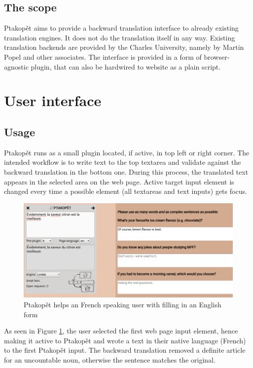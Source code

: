 \documentclass[a4paper]{article}
\begin{document}
\subsection{The scope}
Ptakopět aims to provide a backward translation interface to already existing translation engines. It does not do the translation itself in any way. Existing translation backends are provided by the Charles University, namely by Martin Popel and other associates. The interface is provided in a form of browser-agnostic plugin, that can also be hardwired to website as a plain script.

\pagebreak

\section{User interface}
\subsection{Usage}
Ptakopět runs as a small plugin located, if active, in top left or right corner. The intended workflow is to write text to the top textarea and validate against the backward translation in the bottom one. During this process, the translated text appears in the selected area on the web page. Active target input element is changed every time a possible element (all textareas and text inputs) gets focus.

\vspace{0.2cm}
\begin{figure}[h]
\includegraphics[width=\textwidth]{screenshot_3}
\caption{Ptakopět helps an French speaking user with filling in an English form}
\label{fig:screenshot_3}
\end{figure}
\vspace{0.2cm}

As seen in Figure \ref{fig:screenshot_3}, the user selected the first web page input element, hence making it active to Ptakopět and wrote a text in their native language (French) to the first Ptakopět input. The backward translation removed a definite article for an uncountable noun, otherwise the sentence matches the original.
\end{document}
